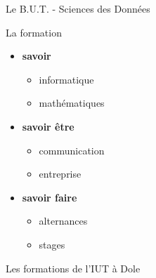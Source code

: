 \documentclass [xcolor=x11names,t] {beamer}
\begin{document}
\begin{frame}{Le B.U.T. - Sciences des Données }
\begin{minipage}{0.45\textwidth}
\begin{block}{La formation}
\begin{itemize}
    \item \textbf{savoir}
     \begin{itemize}
        \item informatique
        \item mathématiques
    \end{itemize}
    \item \textbf{savoir être}
     \begin{itemize}
        \item communication
        \item entreprise
    \end{itemize} 
    \item \textbf{savoir faire} 
     \begin{itemize}
        \item alternances
        \item stages
    \end{itemize}   
\end{itemize}
\end{block}

\end{minipage}
\end{frame}

\begin{frame}{Les formations de l'IUT à Dole} %

  \begin{center}
    \resizebox{1\textheight}{!}{}
  \end{center}
%
\end{frame}
\end{document}
